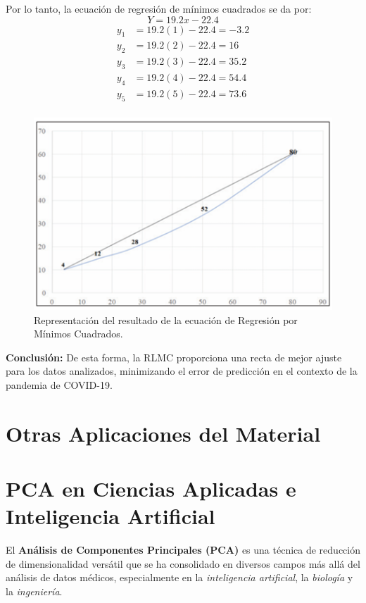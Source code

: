 \documentclass[12pt]{article}
\begin{document}
        Por lo tanto, la ecuación de regresión de mínimos cuadrados se da por:
        \[
        Y = 19.2x - 22.4
        \]
        \[
        \begin{aligned}
                y_1 &= 19.2(1) - 22.4 = -3.2 \\
                y_2 &= 19.2(2) - 22.4 = 16 \\
                y_3 &= 19.2(3) - 22.4 = 35.2 \\
                y_4 &= 19.2(4) - 22.4 = 54.4 \\
                y_5 &= 19.2(5) - 22.4 = 73.6 \\
        \end{aligned}
        \]
        
        \begin{figure}[!h]
                \centering
                \includegraphics[width=0.7\linewidth]{imagenes/Imagen2}
                \caption{Representación del resultado de la ecuación de Regresión por Mínimos Cuadrados.}
                \label{fig:Imagen2}
        \end{figure}
        
        \noindent
        \textbf{Conclusión:} De esta forma, la RLMC proporciona una recta de mejor ajuste para los datos analizados, minimizando el error de predicción en el contexto de la pandemia de COVID-19.
        
        \newpage
        \section{Otras Aplicaciones del Material}
        \section*{PCA en Ciencias Aplicadas e Inteligencia Artificial}
        \noindent
        El \textbf{Análisis de Componentes Principales (PCA)} es una técnica de reducción de dimensionalidad versátil que se ha consolidado en diversos campos más allá del análisis de datos médicos, especialmente en la \emph{inteligencia artificial}, la \emph{biología} y la \emph{ingeniería}.
        
\end{document}
